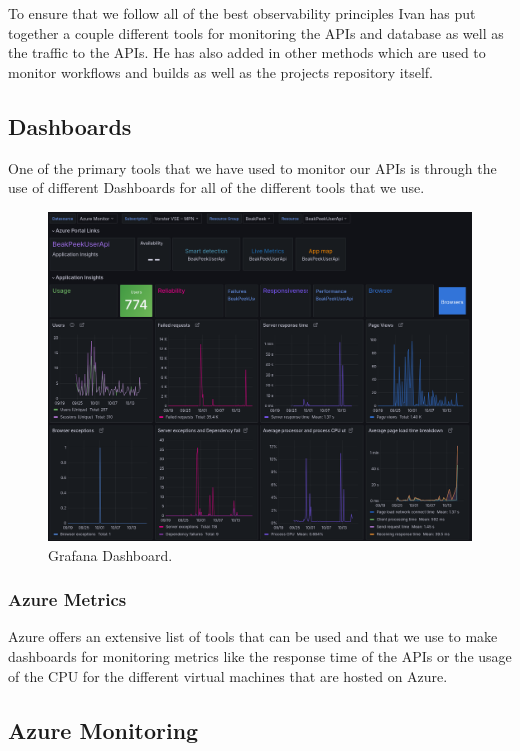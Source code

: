 \documentclass[a4paper]{article}
\begin{document}
To ensure that we follow all of the best observability principles Ivan has put together a 
couple different tools for monitoring the APIs and database as well as the traffic 
to the APIs. He has also added in other methods which are used to monitor workflows and 
builds as well as the projects repository itself.

\subsection{Dashboards}

One of the primary tools that we have used to monitor our APIs is through the use of 
different Dashboards for all of the different tools that we use. 
\begin{figure}[h]
  \includegraphics[width=\linewidth]{../Assets/grafan_user_api.png}
  \caption{Grafana Dashboard.}
  \label{fig:load graphs}
\end{figure}
\subsubsection{Azure Metrics}

Azure offers an extensive list of tools that can be used and that we use to make dashboards for 
monitoring metrics like the response time of the APIs or the usage of the CPU for the 
different virtual machines that are hosted on Azure. 

\subsection{Azure Monitoring}
\end{document}
